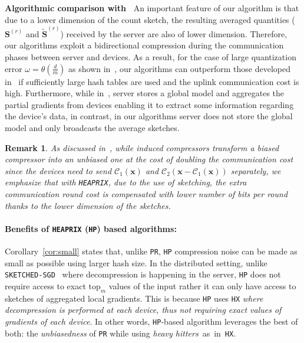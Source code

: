 \documentclass[sigconf, anonymous, review]{acmart}
\newtheorem{remark}{Remark}
\begin{document}
\vspace{0.05in}
\noindent\textbf{Algorithmic comparison  with~\citep{haddadpour2020federated}}
An important feature of our algorithm is that due to a lower dimension of the count sketch, the resulting averaged quantities ($\mathbf{S}^{(r)}$ and  $\tilde{\mathbf{S}}^{(r)}$) received by the server are also of lower dimension. 
Therefore, our algorithms exploit a bidirectional compression during the communication phases between server and devices. 
As a result, for the case of large quantization error $\omega=\theta(\frac{d}{m})$ as shown in~\cite{haddadpour2020federated}, our algorithms can outperform those developed in~\cite{haddadpour2020federated} if sufficiently large hash tables are used and the uplink communication cost is high. 
Furthermore, while in~\cite{haddadpour2020federated}, server stores a global model and aggregates the partial gradients from devices enabling it to extract some information regarding the device's data, in contrast, in our algorithms server does not store the global model and only broadcasts the average sketches. 

\begin{remark}
As discussed in~\cite{horvath2020better}, while induced compressors transform a biased compressor into an unbiased one at the cost of doubling the communication cost since the devices need to send $\mathcal{C}_1(\boldsymbol{x})$ and $\mathcal{C}_2\left(\boldsymbol{x}-\mathcal{C}_1\left(\boldsymbol{x}\right)\right)$ separately, we emphasize that with \texttt{HEAPRIX}, due to the use of sketching, the extra communication round cost is compensated with lower number of bits per round thanks to the lower dimension of the sketches.  
\end{remark}

\paragraph{Benefits of \texttt{HEAPRIX} (\texttt{HP}) based algorithms:} 
Corollary~\ref{cor:small} states that, unlike \texttt{PR}, \texttt{HP} compression noise can be made as small as possible using larger hash size. 
In the distributed setting, unlike \texttt{SKETCHED-SGD}~\citep{ivkin2019communication} where decompression is happening in the server, \texttt{HP} does not require access to exact $\text{top}_m$ values of the input rather it can only have access to sketches of aggregated local gradients. This is because \texttt{HP} uses \texttt{HX} \emph{ where decompression is performed at each device, thus not requiring exact values of gradients of each device}.
In other words, \texttt{HP}-based algorithm leverages the best of both: the \emph{unbiasedness} of \texttt{PR} while using \emph{heavy hitters}~as~in~\texttt{HX}. 
\end{document}
